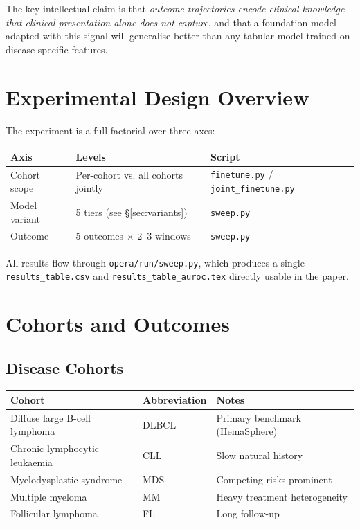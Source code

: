\documentclass[11pt, a4paper]{article}
\newcommand{\code}[1]{\texttt{\small #1}}
\begin{document}
The key intellectual claim is that \emph{outcome trajectories encode
clinical knowledge that clinical presentation alone does not capture},
and that a foundation model adapted with this signal will generalise
better than any tabular model trained on disease-specific features.

\section{Experimental Design Overview}

The experiment is a full factorial over three axes:

\medskip
\begin{center}
\begin{tabular}{lll}
  \toprule
  \textbf{Axis} & \textbf{Levels} & \textbf{Script} \\
  \midrule
  Cohort scope  & Per-cohort vs. all cohorts jointly & \code{finetune.py} / \code{joint\_finetune.py} \\
  Model variant & 5 tiers (see \S\ref{sec:variants}) & \code{sweep.py} \\
  Outcome       & 5 outcomes × 2--3 windows & \code{sweep.py} \\
  \bottomrule
\end{tabular}
\end{center}

\medskip
All results flow through \code{opera/run/sweep.py}, which produces a
single \code{results\_table.csv} and \code{results\_table\_auroc.tex}
directly usable in the paper.

\section{Cohorts and Outcomes}
\label{sec:cohorts}

\subsection{Disease Cohorts}

\begin{center}
\begin{tabular}{lll}
  \toprule
  \textbf{Cohort} & \textbf{Abbreviation} & \textbf{Notes} \\
  \midrule
  Diffuse large B-cell lymphoma & DLBCL & Primary benchmark (HemaSphere) \\
  Chronic lymphocytic leukaemia & CLL   & Slow natural history \\
  Myelodysplastic syndrome      & MDS   & Competing risks prominent \\
  Multiple myeloma              & MM    & Heavy treatment heterogeneity \\
  Follicular lymphoma           & FL    & Long follow-up \\
  \bottomrule
\end{tabular}
\end{center}
\end{document}
